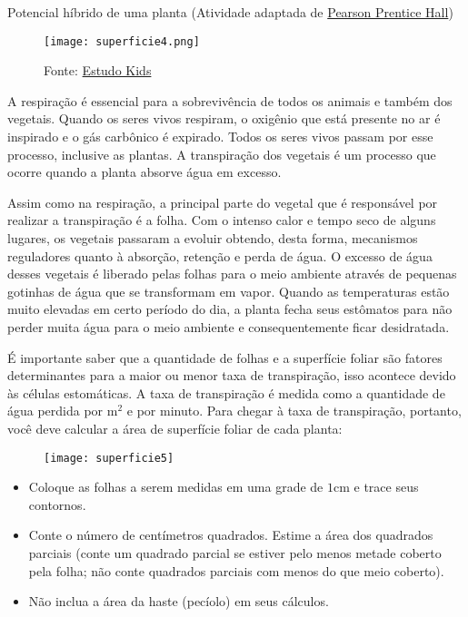 \begin{task}{Potencial híbrido de uma planta}
(Atividade adaptada de \href{http://www.phschool.com/science/biology_place/labbench/lab9/calcsurf.html}{Pearson Prentice Hall})

\begin{wrapfigure}{r}{.5\textwidth}
\centering
  \texttt{[image: superficie4.png]}
  \caption{Fonte: \href{https://www.estudokids.com.br/respiracao-e-transpiracao-dos-vegetais/)}{Estudo Kids}}
\end{wrapfigure}  
A respiração é essencial para a sobrevivência de todos os animais e também dos vegetais. Quando os seres vivos respiram, o oxigênio que está presente no ar é inspirado e o gás carbônico é expirado. Todos os seres vivos passam por esse processo, inclusive as plantas. A transpiração dos vegetais é um processo que ocorre quando a planta absorve água em excesso. 

Assim como na respiração, a principal parte do vegetal que é responsável por realizar a transpiração é a folha. Com o intenso calor e tempo seco de alguns lugares, os vegetais passaram a evoluir obtendo, desta forma, mecanismos reguladores quanto à absorção, retenção e perda de água. O excesso de água desses vegetais é liberado pelas folhas para o meio ambiente através de pequenas gotinhas de água que se transformam em vapor. Quando as temperaturas estão muito elevadas em certo período do dia, a planta fecha seus estômatos para não perder muita água para o meio ambiente e consequentemente ficar desidratada.

É importante saber que a quantidade de folhas e a superfície foliar são fatores determinantes para a maior ou menor taxa de transpiração, isso acontece devido às células estomáticas. A taxa de transpiração é medida como a quantidade de água perdida por m$^2$ e por minuto. Para chegar à taxa de transpiração, portanto, você deve calcular a área de superfície foliar de cada planta: 

\begin{figure}[H]
\centering

\texttt{[image: superficie5]}

\end{figure}

\begin{itemize}
  \item Coloque as folhas a serem medidas em uma grade de $1$cm e trace seus contornos.
  \item Conte o número de centímetros quadrados. Estime a área dos quadrados parciais (conte um quadrado parcial se estiver pelo menos metade coberto pela folha; não conte quadrados parciais com menos do que meio coberto).
  \item Não inclua a área da haste (pecíolo) em seus cálculos.
\end{itemize}


\end{task}
